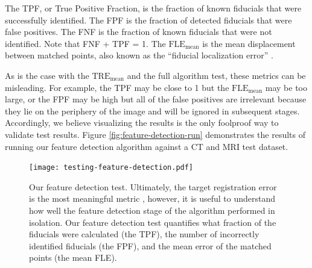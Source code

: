 \documentclass[12pt]{article}
\begin{document}
The TPF, or True Positive Fraction, is the fraction of known fiducials that were successfully identified.  The FPF is the fraction of detected fiducials that were false positives.  The FNF is the fraction of known fiducials that were not identified.  Note that FNF + TPF = 1.  The $\textrm{FLE}_\textrm{mean}$ is the mean displacement between matched points, also known as the ``fiducial localization error'' \cite{hill2001}.

As is the case with the $\textrm{TRE}_\textrm{mean}$ and the full algorithm test, these metrics can be misleading.  For example, the TPF may be close to 1 but the $\textrm{FLE}_\textrm{mean}$ may be too large, or the FPF may be high but all of the false positives are irrelevant because they lie on the periphery of the image and will be ignored in subsequent stages.  Accordingly, we believe visualizing the results is the only foolproof way to validate test results.  Figure \ref{fig:feature-detection-run} demonstrates the results of running our feature detection algorithm against a CT and MRI test dataset.

\begin{figure}
    \centering
    \texttt{[image: testing-feature-detection.pdf]}
    \caption{Our feature detection test.  Ultimately, the target registration error is the most meaningful metric \cite[page R38]{hill2001}, however, it is useful to understand how well the feature detection stage of the algorithm performed in isolation.  Our feature detection test quantifies what fraction of the fiducials were calculated (the TPF), the number of incorrectly identified fiducials (the FPF), and the mean error of the matched points (the mean FLE).}
    \label{fig:testing-feature-detection}
\end{figure}
\end{document}
